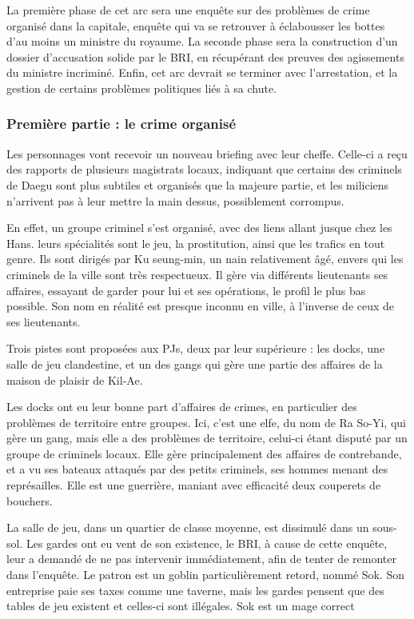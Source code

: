 \documentclass[10pt,a4paper]{book}
\begin{document}
La première phase de cet arc sera une enquête sur des problèmes de crime organisé dans la capitale, enquête qui va se retrouver à éclabousser les bottes d'au moins un ministre du royaume. La seconde phase sera la construction d'un dossier d'accusation solide par le BRI, en récupérant des preuves des agissements du ministre incriminé. Enfin, cet arc devrait se terminer avec l'arrestation, et la gestion de certains problèmes politiques liés à sa chute.

\subsubsection{Première partie : le crime organisé}
Les personnages vont recevoir un nouveau briefing avec leur cheffe. Celle-ci a reçu des rapports de plusieurs magistrats locaux, indiquant que certains des criminels de Daegu sont plus subtiles et organisés que la majeure partie, et les miliciens n'arrivent pas à leur mettre la main dessus, possiblement corrompus.

En effet, un groupe criminel s'est organisé, avec des liens allant jusque chez les Hans. leurs spécialités sont le jeu, la prostitution, ainsi que les trafics en tout genre. Ils sont dirigés par Ku seung-min, un nain relativement âgé, envers qui les criminels de la ville sont très respectueux. Il gère via différents lieutenants ses affaires, essayant de garder pour lui et ses opérations, le profil le plus bas possible. Son nom en réalité est presque inconnu en ville, à l'inverse de ceux de ses lieutenants.

Trois pistes sont proposées aux PJs, deux par leur supérieure : les docks, une salle de jeu clandestine, et un des gangs qui gère une partie des affaires de la maison de plaisir de Kil-Ae.

Les docks ont eu leur bonne part d'affaires de crimes, en particulier des problèmes de territoire entre groupes. Ici, c'est une elfe, du nom de Ra So-Yi, qui gère un gang, mais elle a des problèmes de territoire, celui-ci étant disputé par un groupe de criminels locaux. Elle gère principalement des affaires de contrebande, et a vu ses bateaux attaqués par des petits criminels, ses hommes menant des représailles. Elle est une guerrière, maniant avec efficacité deux couperets de bouchers.

La salle de jeu, dans un quartier de classe moyenne, est dissimulé dans un sous-sol. Les gardes ont eu vent de son existence, le BRI, à cause de cette enquête, leur a demandé de ne pas intervenir immédiatement, afin de tenter de remonter dans l'enquête. Le patron est un goblin particulièrement retord, nommé Sok. Son entreprise paie ses taxes comme une taverne, mais les gardes pensent que des tables de jeu existent et celles-ci sont illégales. Sok est un mage correct
\end{document}
